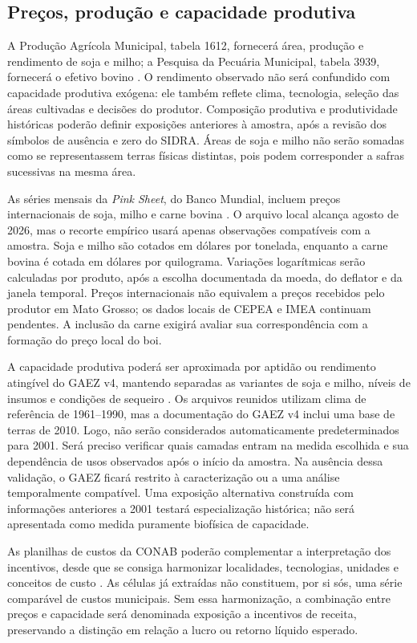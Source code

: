 \subsection{Preços, produção e capacidade produtiva}

A Produção Agrícola Municipal, tabela 1612, fornecerá área, produção e rendimento de soja e milho; a Pesquisa da Pecuária Municipal, tabela 3939, fornecerá o efetivo bovino \cite{IBGEPAM2026,IBGEPPM2026}. O rendimento observado não será confundido com capacidade produtiva exógena: ele também reflete clima, tecnologia, seleção das áreas cultivadas e decisões do produtor. Composição produtiva e produtividade históricas poderão definir exposições anteriores à amostra, após a revisão dos símbolos de ausência e zero do SIDRA. Áreas de soja e milho não serão somadas como se representassem terras físicas distintas, pois podem corresponder a safras sucessivas na mesma área.

As séries mensais da \textit{Pink Sheet}, do Banco Mundial, incluem preços internacionais de soja, milho e carne bovina \cite{WorldBank2026}. O arquivo local alcança agosto de 2026, mas o recorte empírico usará apenas observações compatíveis com a amostra. Soja e milho são cotados em dólares por tonelada, enquanto a carne bovina é cotada em dólares por quilograma. Variações logarítmicas serão calculadas por produto, após a escolha documentada da moeda, do deflator e da janela temporal. Preços internacionais não equivalem a preços recebidos pelo produtor em Mato Grosso; os dados locais de CEPEA e IMEA continuam pendentes. A inclusão da carne exigirá avaliar sua correspondência com a formação do preço local do boi.

A capacidade produtiva poderá ser aproximada por aptidão ou rendimento atingível do GAEZ v4, mantendo separadas as variantes de soja e milho, níveis de insumos e condições de sequeiro \cite{FAOGAEZ2021}. Os arquivos reunidos utilizam clima de referência de 1961--1990, mas a documentação do GAEZ v4 inclui uma base de terras de 2010. Logo, não serão considerados automaticamente predeterminados para 2001. Será preciso verificar quais camadas entram na medida escolhida e sua dependência de usos observados após o início da amostra. Na ausência dessa validação, o GAEZ ficará restrito à caracterização ou a uma análise temporalmente compatível. Uma exposição alternativa construída com informações anteriores a 2001 testará especialização histórica; não será apresentada como medida puramente biofísica de capacidade.

As planilhas de custos da CONAB poderão complementar a interpretação dos incentivos, desde que se consiga harmonizar localidades, tecnologias, unidades e conceitos de custo \cite{CONAB2026}. As células já extraídas não constituem, por si sós, uma série comparável de custos municipais. Sem essa harmonização, a combinação entre preços e capacidade será denominada exposição a incentivos de receita, preservando a distinção em relação a lucro ou retorno líquido esperado.

